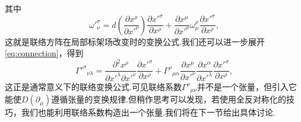 \documentclass[10pt]{article}
\begin{document}
	其中
	\begin{equation}\label{eq:connection}
	{\omega'}^\sigma_\nu=d\left(\frac{\partial{x^\rho}}{\partial{x'}^\nu}\right)\frac{\partial{{x'}^\sigma}}{\partial{x^\rho}}+\frac{\partial{x^\mu}}{\partial{x'}^\nu}\omega^\rho_\mu\frac{\partial{{x'}^\sigma}}{\partial{x^\rho}},
	\end{equation}
	这就是联络方阵在局部标架场改变时的变换公式.我们还可以进一步展开\ref{eq:connection}，得到
	\begin{equation}
	{{\Gamma'}^\sigma}_{\nu\lambda}=\frac{\partial^2{x^\rho}}{\partial{x'}^\lambda\partial{x'}^\nu}\frac{\partial{{x'}^\sigma}}{\partial{x^\rho}}+{\Gamma^\rho}_{\mu\alpha}\frac{\partial{x^\mu}}{\partial{x'}^\nu}\frac{\partial{x}^\alpha}{\partial{x'}^\lambda}\frac{\partial{{x'}^\sigma}}{\partial{x^\rho}},
	\end{equation}
	这正是通常意义下的联络变换公式.可见联络系数${\Gamma^\rho}_{\mu\nu}$并不是一个张量，但引入它能使$D(\partial_\mu)$遵循张量的变换规律.但稍作思考可以发现，若使用全反对称化的技巧，我们也能利用联络系数构造出一个张量.我们将在下一节给出具体讨论.
\end{document}

